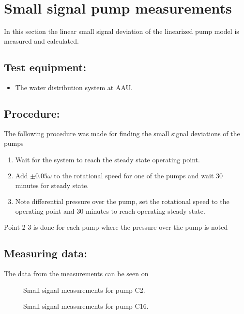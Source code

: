 \section{Small signal pump measurements}
\label{sec:small_sig_pump}

In this section the linear small signal deviation of the linearized pump model is measured and calculated.


\subsection*{Test equipment:}
\begin{itemize}
\item The water distribution system at AAU.
\end{itemize}

\subsection*{Procedure:}
The following procedure was made for finding the small signal deviations of the pumps
\begin{enumerate}
\item Wait for the system to reach the steady state operating point.
\item Add $\pm 0.05\omega$ to the rotational speed for one of the pumps and wait 30 minutes for steady state.
\item Note differential pressure over the pump, set the rotational speed to the operating point and 30 minutes to reach operating steady state. 
\end{enumerate}
Point 2-3 is done for each pump where the pressure over the pump is noted 

\subsection*{Measuring data:}
The data from the measurements can be seen on 

\begin{figure}[H]

\caption{Small signal measurements for pump C2.}
\label{fig:small_sig_diff_press_C2}
\end{figure}

\begin{figure}[H]

\caption{Small signal measurements for pump C16.}
\label{fig:small_sig_diff_press_C16}
\end{figure}


